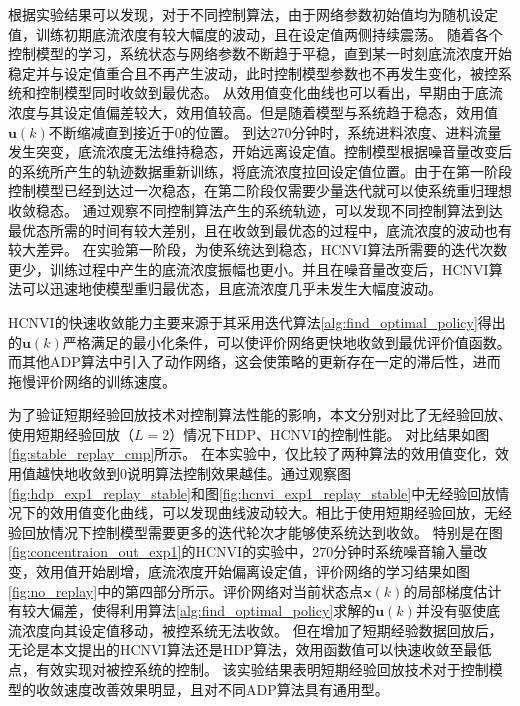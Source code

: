 根据实验结果可以发现，对于不同控制算法，由于网络参数初始值均为随机设定值，训练初期底流浓度有较大幅度的波动，且在设定值两侧持续震荡。
随着各个控制模型的学习，系统状态与网络参数不断趋于平稳，直到某一时刻底流浓度开始稳定并与设定值重合且不再产生波动，此时控制模型参数也不再发生变化，被控系统和控制模型同时收敛到最优态。
从效用值变化曲线也可以看出，早期由于底流浓度与其设定值偏差较大，效用值较高。但是随着模型与系统趋于稳态，效用值${\pmb
u}(k)$不断缩减直到接近于0的位置。
%
到达270分钟时，系统进料浓度、进料流量发生突变，底流浓度无法维持稳态，开始远离设定值。控制模型根据噪音量改变后的系统所产生的轨迹数据重新训练，将底流浓度拉回设定值位置。由于在第一阶段控制模型已经到达过一次稳态，在第二阶段仅需要少量迭代就可以使系统重归理想收敛稳态。
通过观察不同控制算法产生的系统轨迹，可以发现不同控制算法到达最优态所需的时间有较大差别，且在收敛到最优态的过程中，底流浓度的波动也有较大差异。
在实验第一阶段，为使系统达到稳态，HCNVI算法所需要的迭代次数更少，训练过程中产生的底流浓度振幅也更小。并且在噪音量改变后，HCNVI算法可以迅速地使模型重归最优态，且底流浓度几乎未发生大幅度波动。

HCNVI的快速收敛能力主要来源于其采用迭代算法\ref{alg:find_optimal_policy}得出的${\pmb
u}(k)$严格满足的最小化条件，可以使评价网络更快地收敛到最优评价值函数。而其他ADP算法中引入了动作网络，这会使策略的更新存在一定的滞后性，进而拖慢评价网络的训练速度。

为了验证短期经验回放技术对控制算法性能的影响，本文分别对比了无经验回放、使用短期经验回放（$L=2$）情况下HDP、HCNVI的控制性能。
对比结果如图\ref{fig:stable_replay_cmp}所示。
在本实验中，仅比较了两种算法的效用值变化，效用值越快地收敛到0说明算法控制效果越佳。通过观察图\ref{fig:hdp_exp1_replay_stable}和图\ref{fig:hcnvi_exp1_replay_stable}中无经验回放情况下的效用值变化曲线，可以发现曲线波动较大。相比于使用短期经验回放，无经验回放情况下控制模型需要更多的迭代轮次才能够使系统达到收敛。
特别是在图\ref{fig:concentraion_out_exp1}的HCNVI的实验中，270分钟时系统噪音输入量改变，效用值开始剧增，底流浓度开始偏离设定值，评价网络的学习结果如图\ref{fig:no_replay}中的第四部分所示。评价网络对当前状态点$\pmb
x(k)$的局部梯度估计有较大偏差，使得利用算法\ref{alg:find_optimal_policy}求解的${\pmb
u}(k)$并没有驱使底流浓度向其设定值移动，被控系统无法收敛。
但在增加了短期经验数据回放后，无论是本文提出的HCNVI算法还是HDP算法，效用函数值可以快速收敛至最低点，有效实现对被控系统的控制。
该实验结果表明短期经验回放技术对于控制模型的收敛速度改善效果明显，且对不同ADP算法具有通用型。


